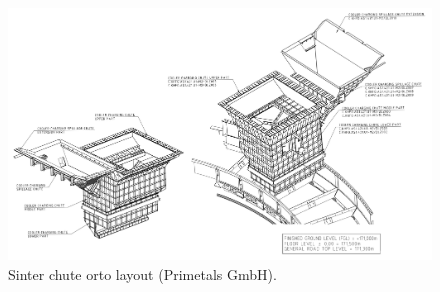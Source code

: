 \begin{figure}[!htb]
\centering
\includegraphics[width=.80\columnwidth]{images/057sinterChuteOrtoLayout}
\caption[Sinter chute orto layout]{Sinter chute orto layout (Primetals GmbH).}
\label{fig:057sinterChuteOrtoLayout}
\end{figure}